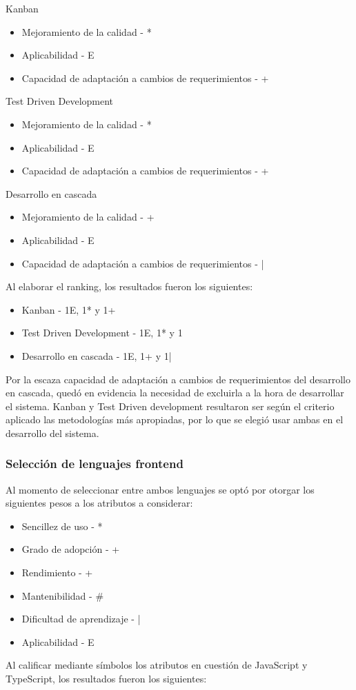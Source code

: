\documentclass{article}
\begin{document}
Kanban
\begin{itemize}
    \item Mejoramiento de la calidad - *
    \item Aplicabilidad - E
    \item Capacidad de adaptación a cambios de requerimientos - +
\end{itemize}
Test Driven Development
\begin{itemize}
    \item Mejoramiento de la calidad - *
    \item Aplicabilidad - E
    \item Capacidad de adaptación a cambios de requerimientos - +
\end{itemize}
Desarrollo en cascada
\begin{itemize}
    \item Mejoramiento de la calidad - +
    \item Aplicabilidad - E
    \item Capacidad de adaptación a cambios de requerimientos - |
\end{itemize}
Al elaborar el ranking, los resultados fueron los siguientes:
\begin{itemize}
    \item Kanban - 1E, 1* y 1+
    \item Test Driven Development - 1E, 1* y 1
    \item Desarrollo en cascada - 1E, 1+ y 1|
\end{itemize}
Por la escaza capacidad de adaptación a cambios de requerimientos del desarrollo en cascada, quedó en evidencia la necesidad de excluirla a la hora de desarrollar el sistema. Kanban y Test Driven development resultaron ser según el criterio aplicado las metodologías más apropiadas, por lo que se elegió usar ambas en el desarrollo del sistema.
\subsubsection{Selección de lenguajes frontend}
Al momento de seleccionar entre ambos lenguajes se optó por otorgar los siguientes pesos a los atributos a considerar:
\begin{itemize}
    \item Sencillez de uso - *
    \item Grado de adopción - +
    \item Rendimiento - +
    \item Mantenibilidad - \#
    \item Dificultad de aprendizaje - |
    \item Aplicabilidad - E
\end{itemize}
Al calificar mediante símbolos los atributos en cuestión de JavaScript y TypeScript, los resultados fueron los siguientes:
\end{document}
